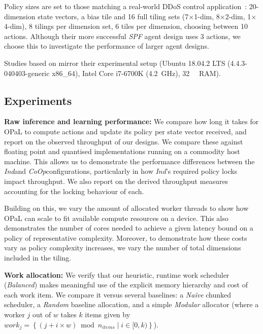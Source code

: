 \documentclass[sigconf,natbib=false]{acmart}
\newcommand{\fakepara}[1]{\noindent\textbf{#1:}}
\newcommand{\approachshort}{OPaL}
\newcommand{\Coopfw}{\emph{CoOp}}
\newcommand{\coopfw}{\Coopfw}
\newcommand{\Indfw}{\emph{Ind}}
\newcommand{\indfw}{\Indfw}
\begin{document}
Policy sizes are set to those matching a real-world DDoS control application~\parencite{DBLP:journals/tnsm/SimpsonRP20}: 20-dimension state vectors, a bias tile and 16 full tiling sets (7$\times$1-dim, 8$\times$2-dim, 1$\times$4-dim), 8 tilings per dimension set, 6 tiles per dimension, choosing between 10 actions.
Although their more successful \emph{SPF} agent design uses 3 actions, we choose this to investigate the performance of larger agent designs.

Studies based on \textcite{DBLP:journals/tnsm/SimpsonRP20} mirror their experimental setup (Ubuntu 18.04.2 LTS (4.4.3-040403-generic x86\_64), Intel Core i7-6700K (\SI{4.2}{\giga\hertz}), \SI{32}{\gibi\byte} RAM).

\subsection{Experiments}

\fakepara{Raw inference and learning performance}
We compare how long it takes for \approachshort{} to compute actions and update its policy per state vector received, and report on the observed throughput of our designs.
We compare these against floating point and quantised implementations running on a commodity host machine.
This allows us to demonstrate the performance differences between the \indfw and \coopfw configurations, particularly in how \indfw's required policy locks impact throughput.
We also report on the derived throughput measures accounting for the locking behaviour of each.

Building on this, we vary the amount of allocated worker threads to show how \approachshort{} can scale to fit available compute resources on a device.
This also demonstrates the number of cores needed to achieve a given latency bound on a policy of representative complexity.
Moreover, to demonstrate how these costs vary as policy complexity increases, we vary the number of total dimensions included in the tiling.

\fakepara{Work allocation}
We verify that our heuristic, runtime work scheduler (\emph{Balanced}) makes meaningful use of the explicit memory hierarchy and cost of each work item.
We compare it versus several baselines: a \emph{Na\"{i}ve} chunked scheduler, a \emph{Random} baseline allocation, and a simple \emph{Modular} allocator (where a worker $j$ out of $w$ takes $k$ items given by $\mathit{work}_j=\left\{\left(j + i \times w\right) \bmod n_{\mathit{items}} \mid i \in [0,k) \right\}$).
\end{document}

